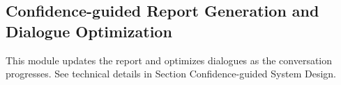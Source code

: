 
\subsection{Confidence-guided Report Generation and Dialogue Optimization}

This module updates the report and optimizes dialogues as the conversation progresses. See technical details in Section Confidence-guided System Design.






